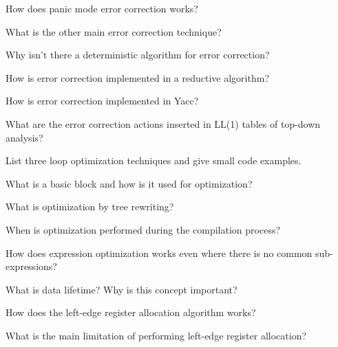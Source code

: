 \begin{Exercise}[difficulty=1]
How does panic mode error correction works?
\end{Exercise}

\begin{Exercise}
What is the other main error correction technique?
\end{Exercise}

\begin{Exercise}
Why isn't there a deterministic algorithm for error correction?
\end{Exercise}

\begin{Exercise}
How is error correction implemented in a reductive algorithm?
\end{Exercise}

\begin{Exercise}[difficulty=1]
How is error correction implemented in Yacc?
\end{Exercise}

\begin{Exercise}
What are the error correction actions inserted in LL(1) tables of top-down analysis?
\end{Exercise}

\begin{Exercise}[difficulty=1]
List three loop optimization techniques and give small code examples.
\end{Exercise}

\begin{Exercise}[difficulty=1]
What is a basic block and how is it used for optimization?
\end{Exercise}

\begin{Exercise}
What is optimization by tree rewriting?
\end{Exercise}

\begin{Exercise}
When is optimization performed during the compilation process?
\end{Exercise}

\begin{Exercise}
How does expression optimization works even where there is no common sub-expressions?
\end{Exercise}

\begin{Exercise}[difficulty=1]
What is data lifetime? Why is this concept important?
\end{Exercise}

\begin{Exercise}
How does the left-edge register allocation algorithm works?
\end{Exercise}

\begin{Exercise}
What is the main limitation of performing left-edge register allocation?
\end{Exercise}